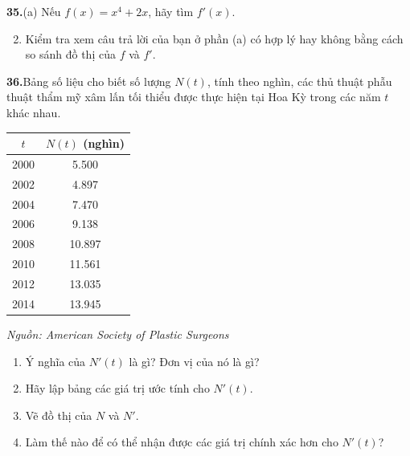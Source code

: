\begin{minipage}[t]{0.48\textwidth}
  \vspace{0.3em}
  \noindent\llap{\casicon\hspace{4pt}}\textbf{35.}\enspace (a) Nếu $f(x) = x^4 + 2x$, hãy tìm $f'(x)$.
  \begin{enumerate}[label=(\alph*), leftmargin=*, topsep=1pt, itemsep=1.5pt]
    \setcounter{enumi}{1}
    \item Kiểm tra xem câu trả lời của bạn ở phần (a) có hợp lý hay không bằng cách so sánh đồ thị của $f$ và $f'$.
  \end{enumerate}

  \vspace{0.3em}
  \noindent\textbf{36.}\enspace Bảng số liệu cho biết số lượng $N(t)$, tính theo nghìn, các thủ thuật phẫu thuật thẩm mỹ xâm lấn tối thiểu được thực hiện tại Hoa Kỳ trong các năm $t$ khác nhau.

  \vspace{0.3em}
  \begin{center}
    \renewcommand{\arraystretch}{1.15}
    \begin{tabular}{|c|c|}
      \hline
      \rowcolor{stewarttablehead} \hspace{1.5em}$t$\hspace{1.5em} & \hspace{1em}$N(t)$ (nghìn)\hspace{1em} \\
      \hline
      2000 & 5.500 \\
      2002 & 4.897 \\
      2004 & 7.470 \\
      2006 & 9.138 \\
      2008 & 10.897 \\
      2010 & 11.561 \\
      2012 & 13.035 \\
      2014 & 13.945 \\
      \hline
    \end{tabular}
  \end{center}
  \vspace{-0.3em}
  \centerline{\fontsize{7.5pt}{9pt}\selectfont\textit{Nguồn: American Society of Plastic Surgeons}}
  \vspace{0.3em}

  \begin{enumerate}[label=(\alph*), leftmargin=*, topsep=1pt, itemsep=1.5pt]
    \item Ý nghĩa của $N'(t)$ là gì? Đơn vị của nó là gì?
    \item Hãy lập bảng các giá trị ước tính cho $N'(t)$.
    \item Vẽ đồ thị của $N$ và $N'$.
    \item Làm thế nào để có thể nhận được các giá trị chính xác hơn cho $N'(t)$?
  \end{enumerate}
\end{minipage}
